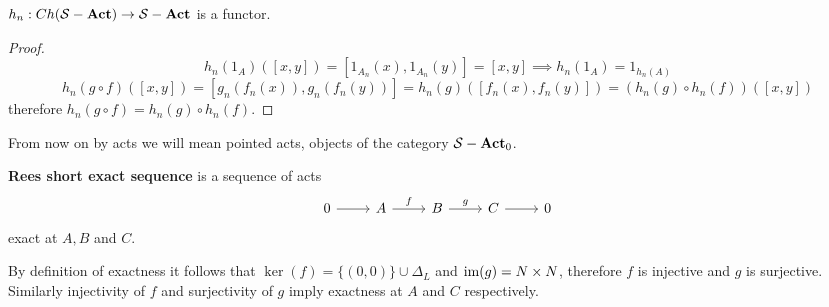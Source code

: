 \begin{proposition}
    $h_n : Ch(\mathcal{S}-\mathrm{\textbf{Act}})\to\mathcal{S}-\mathrm{\textbf{Act}}$ is a functor.
\end{proposition}
\begin{proof}[Proof]
    \[
        h_n(1_A)([x,y]) = [1_{A_n}(x),1_{A_n}(y)] = [x,y] \implies h_n(1_A) = 1_{h_n(A)}
    \]
    \[
        h_n(g\circ f)([x,y]) = [g_n(f_n(x)),g_n(f_n(y))] 
        = h_n(g)([f_n(x), f_n(y)]) = (h_n(g)\circ h_n(f))([x,y])
    \]
    therefore $h_n(g\circ f) = h_n(g)\circ h_n(f)$.
\end{proof}
From now on by acts we will mean pointed acts, objects of the category $\mathcal{S}-\mathrm{\textbf{Act}}_0$. 
\begin{definition}
    \textbf{Rees short exact sequence} is a sequence of acts
    \[\begin{tikzcd}
        0 & A & B & C & 0
        \arrow[from=1-1, to=1-2]
        \arrow["f", from=1-2, to=1-3]
        \arrow["g", from=1-3, to=1-4]
        \arrow[from=1-4, to=1-5]
    \end{tikzcd}\]
    exact at $A,B$ and $C$.
\end{definition}
\begin{remark}
    By definition of exactness it follows that $\ker(f) = \{(0,0)\}\cup\Delta_L$ and 
    $\text{im}(g) = N\times N$, therefore $f$ is injective and $g$ is surjective. Similarly
    injectivity of $f$ and surjectivity of $g$ imply exactness 
    at $A$ and $C$ respectively.
\end{remark}
